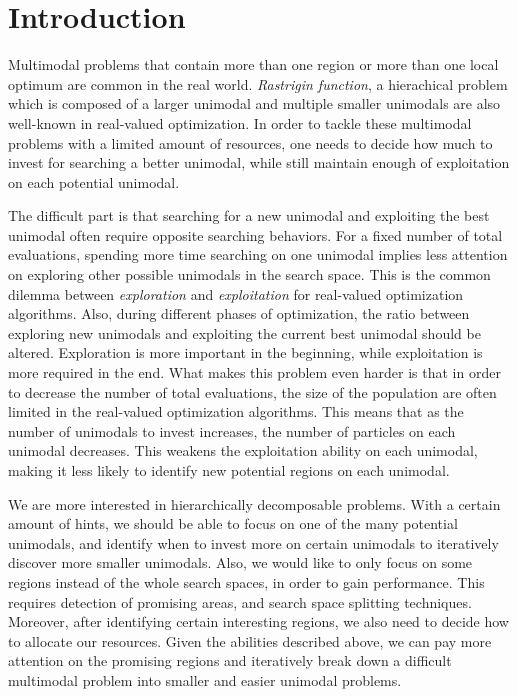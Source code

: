 \chapter{Introduction}
\label{c:intro}

Multimodal problems that contain more than one region or more than one local optimum are common in the real world.
{\em Rastrigin function}, a hierachical problem which is composed of a larger unimodal and multiple smaller unimodals are also well-known in real-valued optimization.
In order to tackle these multimodal problems with a limited amount of resources, 
one needs to decide how much to invest for searching a better unimodal, 
while still maintain enough of exploitation on each potential unimodal.

The difficult part is that searching for a new unimodal and exploiting the best unimodal often require opposite searching behaviors.
For a fixed number of total evaluations, spending more time searching on one unimodal implies 
less attention on exploring other possible unimodals in the search space.
This is the common dilemma between {\em exploration} and {\em exploitation} for real-valued optimization algorithms.
Also, during different phases of optimization, 
the ratio between exploring new unimodals and exploiting the current best unimodal should be altered.
Exploration is more important in the beginning, while exploitation is more required in the end.
What makes this problem even harder is that in order to decrease the number of total evaluations, 
the size of the population are often limited in the real-valued optimization algorithms.
This means that as the number of unimodals to invest increases, the number of particles on each unimodal decreases.
This weakens the exploitation ability on each unimodal, making it less likely to identify new potential regions on each unimodal.

We are more interested in hierarchically decomposable problems.
With a certain amount of hints, we should be able to focus on one of the many potential unimodals, 
and identify when to invest more on certain unimodals to iteratively discover more smaller unimodals.
Also, we would like to only focus on some regions instead of the whole search spaces, in order to gain performance.
This requires detection of promising areas, and search space splitting techniques.
Moreover, after identifying certain interesting regions, we also need to decide how to allocate our resources.
Given the abilities described above, 
we can pay more attention on the promising regions and 
iteratively break down a difficult multimodal problem into smaller and easier unimodal problems.

